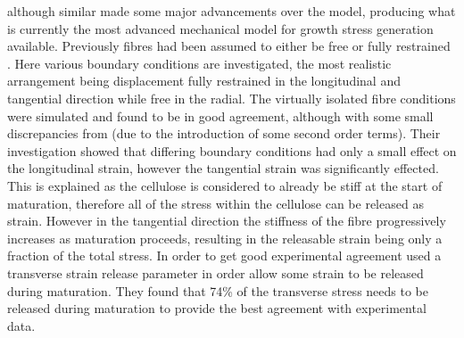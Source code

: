 \cite{Alm_ras_2005}
although similar made some major advancements over the \cite{Yamamoto_1998} model,
producing what is currently the most advanced mechanical model for growth
stress generation available. Previously fibres had been assumed to either be
free \cite{Yamamoto_1998} or fully restrained \cite{archer1987}\cite{archer1989}. Here
various boundary conditions are investigated, the most realistic arrangement being
displacement fully restrained in the longitudinal and tangential direction while
free in the radial. The virtually isolated fibre conditions were simulated
and found to be in good agreement, although with some small discrepancies from
\cite{Yamamoto_1998} (due to the introduction of some second order terms).  Their
investigation showed that differing boundary conditions had only a small effect
on the longitudinal strain, however the tangential strain was significantly
effected. This is explained as the cellulose is considered to already be stiff at
the start of maturation, therefore all of the stress within the cellulose can be
released as strain. However in the tangential direction the stiffness of the
fibre progressively increases as maturation proceeds, resulting in the
releasable strain being only a fraction of the total stress. In order to get good
experimental agreement \cite{Alm_ras_2005} used a transverse strain release
parameter in order allow some strain to be released during maturation. They
found that 74\% of the transverse stress needs to be released during maturation
to provide the best agreement with experimental data.